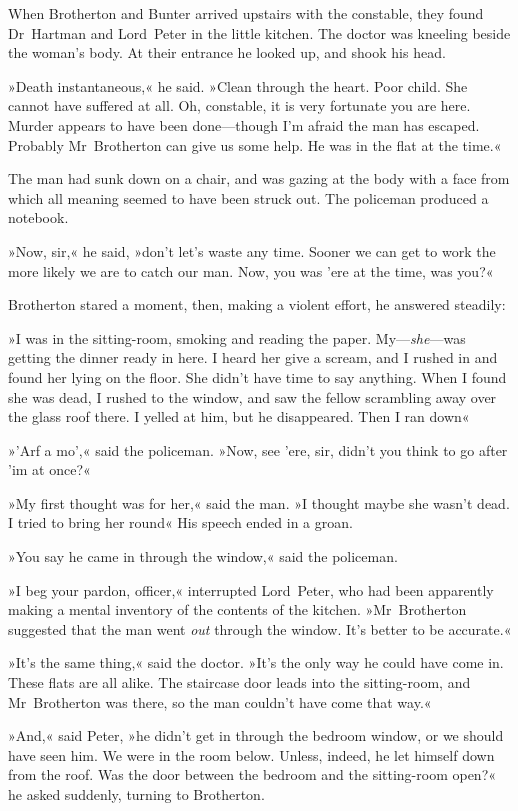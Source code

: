 When Brotherton and Bunter arrived upstairs with the constable, they found Dr~Hartman and Lord~Peter in the little kitchen. The doctor was kneeling beside the woman's body. At their entrance he looked up, and shook his head.

»Death instantaneous,« he said. »Clean through the heart. Poor child. She cannot have suffered at all. Oh, constable, it is very fortunate you are here. Murder appears to have been done—though I'm afraid the man has escaped. Probably Mr~Brotherton can give us some help. He was in the flat at the time.«

The man had sunk down on a chair, and was gazing at the body with a face from which all meaning seemed to have been struck out. The policeman produced a notebook.

»Now, sir,« he said, »don't let's waste any time. Sooner we can get to work the more likely we are to catch our man. Now, you was 'ere at the time, was you?«

Brotherton stared a moment, then, making a violent effort, he answered steadily:

»I was in the sitting-room, smoking and reading the paper. My—\textit{she}—was getting the dinner ready in here. I heard her give a scream, and I rushed in and found her lying on the floor. She didn't have time to say anything. When I found she was dead, I rushed to the window, and saw the fellow scrambling away over the glass roof there. I yelled at him, but he disappeared. Then I ran down\longdash«

»'Arf a mo',« said the policeman. »Now, see 'ere, sir, didn't you think to go after 'im at once?«

»My first thought was for her,« said the man. »I thought maybe she wasn't dead. I tried to bring her round\longdash« His speech ended in a groan.

»You say he came in through the window,« said the policeman.

»I beg your pardon, officer,« interrupted Lord~Peter, who had been apparently making a mental inventory of the contents of the kitchen. »Mr~Brotherton suggested that the man went \textit{out} through the window. It's better to be accurate.«

»It's the same thing,« said the doctor. »It's the only way he could have come in. These flats are all alike. The staircase door leads into the sitting-room, and Mr~Brotherton was there, so the man couldn't have come that way.«

»And,« said Peter, »he didn't get in through the bedroom window, or we should have seen him. We were in the room below. Unless, indeed, he let himself down from the roof. Was the door between the bedroom and the sitting-room open?« he asked suddenly, turning to Brotherton.

